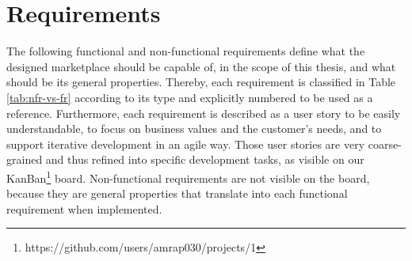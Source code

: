 \chapter{Requirements}
\label{cha:requirements}

The following functional and non-functional requirements define what the designed marketplace should be capable of, in the scope of this thesis, and what should be its general properties. Thereby, each requirement is classified in Table \ref{tab:nfr-vs-fr} according to its type and explicitly numbered to be used as a reference. Furthermore, each requirement is described as a user story to be easily understandable, to focus on business values and the customer's needs, and to support iterative development in an agile way. Those user stories are very coarse-grained and thus refined into specific development tasks, as visible on our KanBan\footnote{https://github.com/users/amrap030/projects/1} board. Non-functional requirements are not visible on the board, because they are general properties that translate into each functional requirement when implemented.


